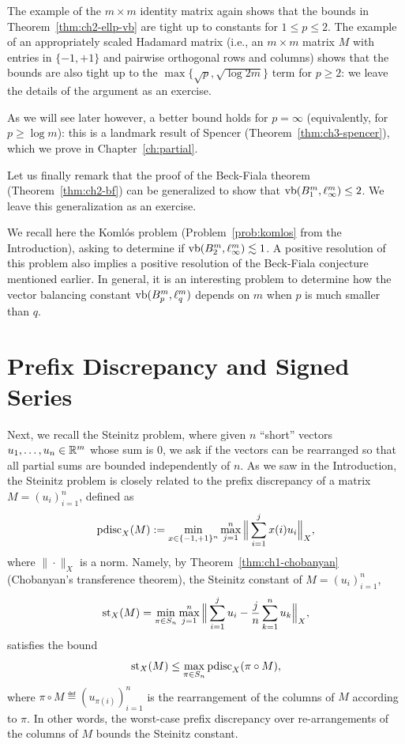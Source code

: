 
The example of the \(m\times m\) identity matrix again shows that the
bounds in Theorem~\ref{thm:ch2-ellp-vb} are tight up to constants for
\(1 \le p \le 2\). The example of an appropriately scaled Hadamard matrix (i.e., an $m\times m$ matrix $M$ with entries in $\{-1,+1\}$ and pairwise orthogonal rows and columns) shows that the bounds are also tight up to the \(\max\{\sqrt{p},\sqrt{\log 2m}\}\)
term for \(p \ge 2\): we leave the details of the argument as an exercise.

As we will see later %
however, a better bound holds for \(p = \infty\) (equivalently, for $p \ge \log m$): this is a landmark result of Spencer (Theorem~\ref{thm:ch3-spencer}), which we prove in Chapter~\ref{ch:partial}.


Let us finally remark that the proof of the Beck-Fiala theorem
(Theorem~\ref{thm:ch2-bf}) can be generalized to show that \(\operatorname{vb}(B_1^m,
\ell_\infty^m) \le 2\). We leave this generalization as an
exercise. 

We recall here the  Koml\'os problem
(Problem~\ref{prob:komlos} from the Introduction), asking to determine
if \(\operatorname{vb}(B_2^m, \ell_\infty^m) \lesssim 1\). A positive resolution of this problem also implies a
positive resolution of the Beck-Fiala conjecture mentioned earlier.
In general, it is an interesting problem to determine how the vector
balancing constant \(\operatorname{vb}(B_p^m, \ell_q^m)\) depends on \(m\) when
\(p\) is much smaller than \(q\).

\section{Prefix Discrepancy and Signed Series}

Next, we recall the Steinitz problem, where given \(n\) ``short''
vectors \(u_1, \ldots, u_n \in \mathbb{R}^m\) whose sum is \(0\), we ask
if the vectors can be rearranged so that all partial sums are
bounded independently of \(n\). As we saw in the Introduction, the Steinitz problem is closely related to the
prefix discrepancy of a matrix \(M = (u_i)_{i = 1}^n\), defined as
\[
  \operatorname{pdisc}_X(M) := \min_{x \in \{-1, +1\}^n}
  \max_{j=1}^n \Big\|\sum_{i = 1}^j x(i) u_i\Big\|_X,
\]
where \(\|\cdot\|_X\) is a norm. Namely, by
Theorem~\ref{thm:ch1-chobanyan} (Chobanyan's transference theorem), 
the Steinitz
constant of \(M = (u_i)_{i = 1}^n\), 
\[
  \operatorname{st}_X(M) = \min_{\pi \in S_n} \max_{j = 1}^n \Big\|\sum_{i = 1}^j
     u_i - \frac{j}{n} \sum_{k = 1}^n u_k\Big\|_X,
\]
satisfies the bound
\[
  \operatorname{st}_X(M) \le \max_{\pi \in S_n}\operatorname{pdisc}_X(\pi \circ M),
\]
where \(\pi \circ M \eqdef (u_{\pi(i)})_{i = 1}^n\) is the rearrangement of
the columns of \(M\) according to \(\pi\). In other words, the
worst-case prefix discrepancy over re-arrangements of the columns of
\(M\) bounds the Steinitz constant.

